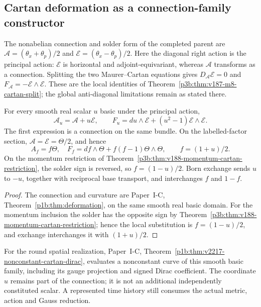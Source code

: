 \documentclass[12pt,a4paper]{article}
\begin{document}
\subsection{Cartan deformation as a connection-family constructor}
\label{p3b:sec:v199-cartan-deformation}
The nonabelian connection and solder form of the completed parent are
\(\mathcal A=(\theta_x+\theta_p)/2\) and
\(\mathcal E=(\theta_x-\theta_p)/2\).  Here the diagonal right action is
the principal action: \(\mathcal E\) is horizontal and adjoint-equivariant,
whereas \(\mathcal A\) transforms as a connection.  Splitting the two
Maurer--Cartan equations gives
\(D_{\mathcal A}\mathcal E=0\) and
\(F_{\mathcal A}=-\mathcal E\wedge\mathcal E\).
These are the local identities of
Theorem~\ref{p3b:thm:v187-m8-cartan-split}; the global anti-diagonal
limitations remain as stated there.

\begin{theorem}
\label{p3b:thm:v199-cartan-deformation}
For every smooth real scalar \(u\) basic under the principal action,
\begin{equation}
 \mathscr A_u=\mathcal A+u\mathcal E,\qquad
 F_u=du\wedge\mathcal E+(u^2-1)\mathcal E\wedge\mathcal E.
 \label{p3b:eq:v199-cartan-curvature}
\end{equation}
The first expression is a connection on the same bundle.  On the
labelled-factor section, \(\mathcal A=\mathcal E=\Theta/2\), and hence
\begin{equation}
 A_f=f\Theta,\quad
 F_f=df\wedge\Theta+f(f-1)\Theta\wedge\Theta,
 \qquad f=(1+u)/2.
 \label{p3b:eq:v199-reduced-connection}
\end{equation}
On the momentum restriction of
Theorem~\ref{p3b:thm:v188-momentum-cartan-restriction}, the solder sign is
reversed, so \(f=(1-u)/2\).  Born exchange sends \(u\) to \(-u\), together
with reciprocal base transport, and interchanges \(f\) and \(1-f\).
\end{theorem}
\begin{proof}
The connection and curvature are Paper~I-C,
Theorem~\ref{p1b:thm:deformation}, on the same smooth real basic domain.
For the momentum inclusion the solder has the opposite sign by
Theorem~\ref{p3b:thm:v188-momentum-cartan-restriction}; hence the local
substitution is \(f=(1-u)/2\), and exchange interchanges it with
\((1+u)/2\).
\end{proof}

\begin{remark}
\label{p3b:rem:v2217-nonconstant-cartan-import}
For the round spatial realization, Paper~I-C,
Theorem~\ref{p1b:thm:v2217-nonconstant-cartan-dirac}, evaluates a nonconstant
curve of this smooth basic family, including its gauge projection and signed
Dirac coefficient. The coordinate $u$ remains part of the connection;
it is not an additional independently constituted scalar. A represented
time history still consumes the actual metric, action and Gauss reduction.
\end{remark}
\end{document}

